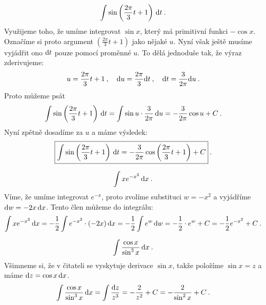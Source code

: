 \begin{example}
    \begin{align}
        \int \sin \left(\frac{2 \pi }{3} t + 1 \right) \, \mathrm{d} t \:.
    \end{align}
    Využijeme toho, že umíme integrovat $\sin x$, který má primitivní funkci $- \cos x$. Označíme si proto argument $\left(\frac{2 \pi }{3} t + 1 \right)$ jako nějaké $u$. Nyní však ještě musíme vyjádřit ono $\mathrm{d} t$ pouze pomocí proměnné $u$. To dělá jednoduše tak, že výraz zderivujeme:
    \begin{align}
        u = \frac{2 \pi }{3} t + 1 \:, \quad \mathrm{d} u = \frac{2 \pi}{3} \mathrm{d} t \:, \quad \mathrm{d} t = \frac{3}{2 \pi} \mathrm{d} u \:.
    \end{align}
    Proto můžeme psát \begin{align}
        \int \sin \left(\frac{2 \pi }{3} t + 1 \right) \, \mathrm{d} t = \int \sin u \cdot \frac{3}{2 \pi} \, \mathrm{d} u = -\frac{3}{2 \pi} \cos u + C \:.
    \end{align}
    Nyní zpětně dosadíme za $u$ a máme výsledek:
    \begin{align}
        \boxed{ \int \sin \left(\frac{2 \pi }{3} t + 1 \right) \, \mathrm{d} t = -\frac{3}{2 \pi} \cos \left(\frac{2 \pi }{3} t + 1 \right) + C }\:.
    \end{align}
\end{example}

\begin{example}
    \begin{align}
        \int x e^{-x^2} \, \mathrm{d} x \:.
    \end{align}
    Víme, že umíme integrovat $e^{-x}$, proto zvolíme substituci $w = -x^2$ a vyjádříme $\mathrm{d} w = - 2 x \, \mathrm{d} x$. Tento člen můžeme  do integrálu:
    \begin{align}
        \int x e^{-x^2} \, \mathrm{d} x = -\frac{1}{2} \int e^{-x^2} \cdot (-2x) \, \mathrm{d} x = - \frac{1}{2} \int e^{w} \, \mathrm{d} w = - \frac{1}{2} \cdot e^{w} + C = -\frac{1}{2} e^{-x^2} + C \:.
    \end{align}
\end{example}

\begin{example}
    \begin{align}
        \int \frac{\cos x}{\sin^3 x} \, \mathrm{d} x \:.
    \end{align}
    Všimneme si, že v čitateli se vyskytuje derivace $\sin x$, takže položíme $\sin x = z$ a máme $\mathrm{d} z = \cos x \, \mathrm{d} x$.
    \begin{align}
        \int \frac{\cos x}{\sin^3 x} \, \mathrm{d} x = \int \frac{\mathrm{d} z}{z^3} = - \frac{2}{z^2} + C = - \frac{2}{\sin^2 x} + C \:.
    \end{align}
\end{example}

